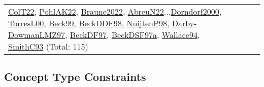 {\begin{longtable}{p{3cm}r>{\raggedright\arraybackslash}p{6cm}>{\raggedright\arraybackslash}p{6cm}>{\raggedright\arraybackslash}p{8cm}}
\hyperref[detail:ColT22]{ColT22}, \hyperref[detail:PohlAK22]{PohlAK22}, \hyperref[detail:Braune2022]{Braune2022}, \hyperref[detail:AbreuN22]{AbreuN22}...\hyperref[detail:Dorndorf2000]{Dorndorf2000}, \hyperref[detail:TorresL00]{TorresL00}, \hyperref[detail:Beck99]{Beck99}, \hyperref[detail:BeckDDF98]{BeckDDF98}, \hyperref[detail:NuijtenP98]{NuijtenP98}, \hyperref[detail:Darby-DowmanLMZ97]{Darby-DowmanLMZ97}, \hyperref[detail:BeckDF97]{BeckDF97}, \hyperref[detail:BeckDSF97a]{BeckDSF97a}, \hyperref[detail:Wallace94]{Wallace94}, \hyperref[detail:SmithC93]{SmithC93} (Total: 115)\\
\end{longtable}
}

\clearpage
\subsection{Concept Type Constraints}
\label{sec:Constraints}
\label{Constraints}
